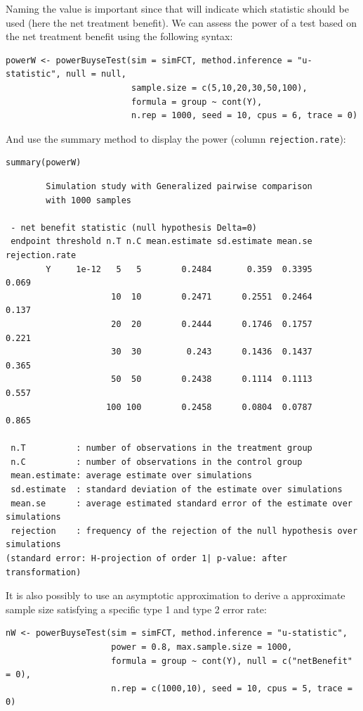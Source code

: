 \documentclass[12pt]{article}
\begin{document}
Naming the value is important since that will indicate which statistic
should be used (here the net treatment benefit). We can assess the power of a
test based on the net treatment benefit using the following syntax:
\lstset{language=r,label= ,caption= ,captionpos=b,numbers=none}
\begin{lstlisting}
powerW <- powerBuyseTest(sim = simFCT, method.inference = "u-statistic", null = null,
                         sample.size = c(5,10,20,30,50,100),                         
                         formula = group ~ cont(Y), 
                         n.rep = 1000, seed = 10, cpus = 6, trace = 0)
\end{lstlisting}

\clearpage

And use the summary method to display the power (column
\texttt{rejection.rate}):
\lstset{language=r,label= ,caption= ,captionpos=b,numbers=none}
\begin{lstlisting}
summary(powerW)
\end{lstlisting}

\begin{verbatim}
        Simulation study with Generalized pairwise comparison
        with 1000 samples

 - net benefit statistic (null hypothesis Delta=0)
 endpoint threshold n.T n.C mean.estimate sd.estimate mean.se rejection.rate
        Y     1e-12   5   5        0.2484       0.359  0.3395          0.069
                     10  10        0.2471      0.2551  0.2464          0.137
                     20  20        0.2444      0.1746  0.1757          0.221
                     30  30         0.243      0.1436  0.1437          0.365
                     50  50        0.2438      0.1114  0.1113          0.557
                    100 100        0.2458      0.0804  0.0787          0.865

 n.T          : number of observations in the treatment group
 n.C          : number of observations in the control group
 mean.estimate: average estimate over simulations
 sd.estimate  : standard deviation of the estimate over simulations
 mean.se      : average estimated standard error of the estimate over simulations
 rejection    : frequency of the rejection of the null hypothesis over simulations
(standard error: H-projection of order 1| p-value: after transformation)
\end{verbatim}

It is also possibly to use an asymptotic approximation to derive a
approximate sample size satisfying a specific type 1 and type 2 error
rate:
\lstset{language=r,label= ,caption= ,captionpos=b,numbers=none}
\begin{lstlisting}
nW <- powerBuyseTest(sim = simFCT, method.inference = "u-statistic", 
                     power = 0.8, max.sample.size = 1000,                     
                     formula = group ~ cont(Y), null = c("netBenefit" = 0),
                     n.rep = c(1000,10), seed = 10, cpus = 5, trace = 0)
\end{lstlisting}
\end{document}
